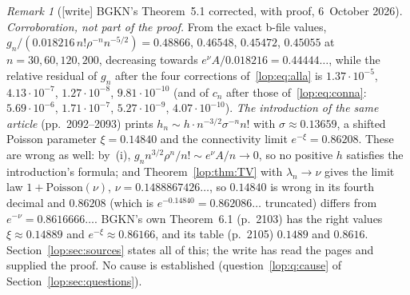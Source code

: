 \documentclass[11pt,letterpaper]{article}
\numberwithin{equation}{section}
\theoremstyle{remark}\newtheorem{remark}[theorem]{Remark}
\begin{document}
\begin{remark}[{[write]} BGKN's Theorem~5.1 corrected, with proof, 6~October 2026]
\emph{Corroboration, not part of the proof.} From the exact b-file values,
$g_n/(0.018216\,n!\rho^{-n}n^{-5/2})=0.48866$, $0.46548$, $0.45472$,
$0.45055$ at $n=30,60,120,200$, decreasing towards
$e^\nu A/0.018216=0.44444\ldots$, while the relative residual of $g_n$
after the four corrections of~\eqref{lop:eq:alla} is $1.37\cdot10^{-5}$,
$4.13\cdot10^{-7}$, $1.27\cdot10^{-8}$, $9.81\cdot10^{-10}$ (and of $c_n$
after those of~\eqref{lop:eq:conna}: $5.69\cdot10^{-6}$, $1.71\cdot10^{-7}$,
$5.27\cdot10^{-9}$, $4.07\cdot10^{-10}$). \emph{The introduction of the same
article} (pp.~2092--2093) prints $h_n\sim h\cdot n^{-3/2}\sigma^{-n}n!$ with
$\sigma\approx0.13659$, a shifted Poisson parameter $\xi=0.14840$ and the
connectivity limit $e^{-\xi}=0.86208$. These are wrong as well: by~(i),
$g_n n^{3/2}\rho^n/n!\sim e^\nu A/n\to0$, so no positive $h$ satisfies the
introduction's formula; and Theorem~\ref{lop:thm:TV} with $\lambda_n\to\nu$
gives the limit law $1+\mathrm{Poisson}(\nu)$, $\nu=0.1488867426\ldots$, so
$0.14840$ is wrong in its fourth decimal and $0.86208$ (which is
$e^{-0.14840}=0.862086\ldots$ truncated) differs from
$e^{-\nu}=0.8616666\ldots$. BGKN's own Theorem~6.1 (p.~2103) has the right
values $\xi\approx0.14889$ and $e^{-\xi}\approx0.86166$, and its table
(p.~2105) $0.1489$ and $0.8616$. Section~\ref{lop:sec:sources} states all of
this; the write has read the pages and supplied the proof. No cause is
established (question~\ref{lop:q:cause} of Section~\ref{lop:sec:questions}).
\end{remark}
\end{document}
